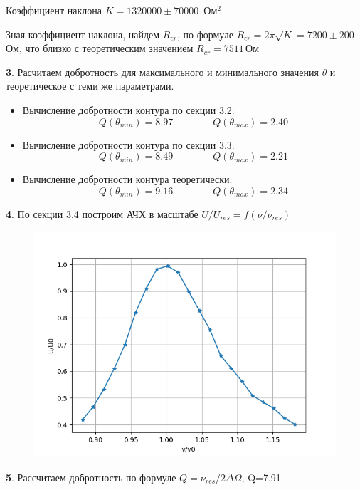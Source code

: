 \documentclass[a4paper,12pt]{article}
\theoremstyle{definition}
\begin{document}
Коэффициент наклона $K=1320000 \pm 70000$\, Ом$^2$ \par
Зная коэффициент наклона, найдем $R_{cr}$, по формуле $R_{cr}=2\pi \sqrt{K}=7200 \pm 200$\,Ом, что близко с теоретическим значением $R_{cr}=7511$\,Ом \par
\textbf{3}. Расчитаем добротность для максимального и минимального значения $\theta$ и теоретическое с теми же параметрами.
\begin{itemize}
    \item Вычисление добротности контура по секции 3.2:\\
$$Q(\theta_{min})= 8.97 \qquad \qquad  Q(\theta_{max})= 2.40  $$
\item Вычисление добротности контура по секции 3.3:\\
$$Q(\theta_{min})= 8.49 \qquad \qquad  Q(\theta_{max})= 2.21  $$
    \item Вычисление добротности контура теоретически:\\   
$$Q(\theta_{min})= 9.16 \qquad \qquad  Q(\theta_{max})= 2.34  $$
\end{itemize}
\textbf{4}. По секции 3.4 построим АЧХ в масштабе $U/U_{res}=f(\nu /\nu_{res})$
\begin{figure}[H]
    \centering
    \includegraphics{324 3.png}    
\end{figure} \par
\textbf{5}. Рассчитаем добротность по формуле $Q=\nu_{res}/2\Delta \Omega$, Q=7.91
\end{document}
